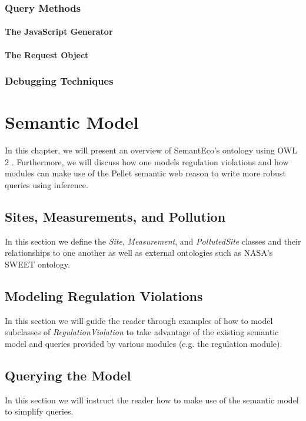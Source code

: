 \documentclass[letterpaper]{report}
\begin{document}
\subsection{Query Methods}

\subsubsection{The JavaScript Generator}

\subsubsection{The Request Object}

\subsection{Debugging Techniques}

\chapter{Semantic Model}
\label{semantic-model}
In this chapter, we will present an overview of SemantEco's ontology using OWL 2 \cite{OWL2}. Furthermore, we will discuss how one models regulation violations and how modules can make use of the Pellet \cite{Pellet} semantic web reason to write more robust queries using inference.
\section{Sites, Measurements, and Pollution}
\label{class-defs}
In this section we define the \textit{Site}, \textit{Measurement}, and \textit{PollutedSite} classes and their relationships to one another as well as external ontologies such as NASA's SWEET ontology.
\section{Modeling Regulation Violations}
\label{regulation-violation}
In this section we will guide the reader through examples of how to model subclasses of \textit{RegulationViolation} to take advantage of the existing semantic model and queries provided by various modules (e.g. the regulation module).
\section{Querying the Model}
\label{querying}
In this section we will instruct the reader how to make use of the semantic model to simplify queries.
\end{document}
